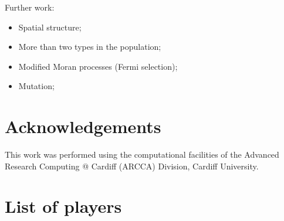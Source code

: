 \documentclass{article}
\begin{document}

Further work:

\begin{itemize}
    \item Spatial structure;
    \item More than two types in the population;
    \item Modified Moran processes (Fermi selection);
    \item Mutation;
\end{itemize}

\section*{Acknowledgements}

This work was performed using the computational facilities of the Advanced
Research Computing @ Cardiff (ARCCA) Division, Cardiff University.

\printbibliography

\appendix

\section{List of players}\label{app:list_of_players}

\begin{multicols}{3}
	\begin{enumerate}
		
	\end{enumerate}
\end{multicols}
\end{document}
